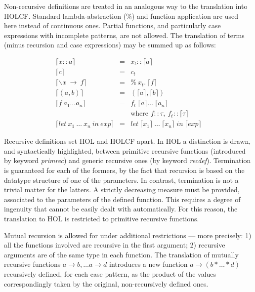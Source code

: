 \documentclass{llncs}
\begin{document}
Non-recursive definitions are treated in an analogous way to the
translation into HOLCF. Standard lambda-abstraction ($\%$) and
function application are used here instead of continuous ones. Partial
functions, and particularly case expressions with incomplete patterns,
are not allowed. The translation of terms (minus recursion and case
expressions) may be summed up as follows:

$$\begin{array}{lcl} 
  \lceil x::a \rceil & = & x_{t}::\lceil a \rceil \\
  \lceil c \rceil & = & c_{t} \\
  \lceil \backslash x \ \to \ f \rceil & = & \% \ x_{t}. \ \lceil f \rceil \\
  \lceil (a,b) \rceil & = & (\lceil a \rceil, \lceil b \rceil) \\
  \lceil f \ a_{1} \ldots a_{n} \rceil & = & f_{t} \ \lceil a \rceil \ldots \  \lceil a_{n} \rceil \\
  & & \mbox{where } f::\tau, \ f_{t}::\lceil \tau \rceil \\
  \lceil let \ x_{1} \ \dots \ x_{n} \ in \ exp \rceil & = 
  & let \ \lceil x_{1} \rceil \ \dots \ \lceil x_{n} \rceil \ in \ \lceil exp \rceil 
\end{array}$$

\noindent Recursive definitions set HOL and HOLCF apart.  In HOL a
distinction is drawn, and syntactically highlighted, between primitive
recursive functions (introduced by keyword \emph{primrec}) and generic
recursive ones (by keyword \emph{recdef}).  Termination is guaranteed
for each of the formers, by the fact that recursion is based on the
datatype structure of one of the parameters. In contrast, termination
is not a trivial matter for the latters. A strictly decreasing measure
must be provided, associated to the parameters of the defined
function. This requires a degree of ingenuity that cannot be easily
dealt with automatically. For this reason, the translation to HOL is
restricted to primitive recursive functions.

Mutual recursion is allowed for under additional restrictions --- more
precisely: 1) all the functions involved are recursive in the first
argument; 2) recursive arguments are of the same type in each
function.  The translation of mutually recursive functions $a
\rightarrow b, \ldots a \rightarrow d$ introduces a new function $a
\rightarrow (b * \ldots * d)$ recursively defined, for each case
pattern, as the product of the values
correspondingly taken by the original, non-recursively defined ones. \\
\end{document}
